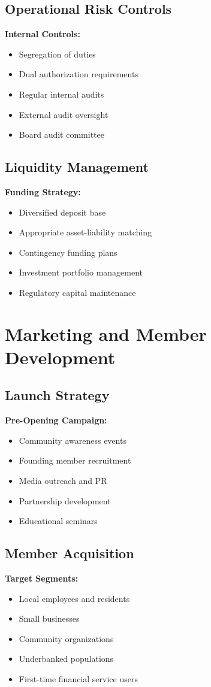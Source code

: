 \documentclass[11pt,letterpaper]{article}
\begin{document}
\subsection{Operational Risk Controls}
\textbf{Internal Controls:}
\begin{itemize}[leftmargin=*]
    \item Segregation of duties
    \item Dual authorization requirements
    \item Regular internal audits
    \item External audit oversight
    \item Board audit committee
\end{itemize}

\subsection{Liquidity Management}
\textbf{Funding Strategy:}
\begin{itemize}[leftmargin=*]
    \item Diversified deposit base
    \item Appropriate asset-liability matching
    \item Contingency funding plans
    \item Investment portfolio management
    \item Regulatory capital maintenance
\end{itemize}

\section{Marketing and Member Development}

\subsection{Launch Strategy}
\textbf{Pre-Opening Campaign:}
\begin{itemize}[leftmargin=*]
    \item Community awareness events
    \item Founding member recruitment
    \item Media outreach and PR
    \item Partnership development
    \item Educational seminars
\end{itemize}

\subsection{Member Acquisition}
\textbf{Target Segments:}
\begin{itemize}[leftmargin=*]
    \item Local employees and residents
    \item Small businesses
    \item Community organizations
    \item Underbanked populations
    \item First-time financial service users
\end{itemize}
\end{document}
